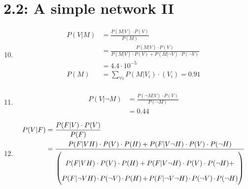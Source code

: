 \documentclass[a4paper,10pt,fleqn]{article}
\begin{document}
\section*{2.2: A simple network II}

\begin{enumerate}[1.]
    \setcounter{enumi}{9}

    \item
        \begin{align*}
            P(V|M)
                & = \frac{P(M|V)\cdot P(V)}{P(M)} \\
                & = \frac{P(M|V)\cdot P(V)}{P(M|V)\cdot P(V) + P(M|\lnot V)\cdot P(\lnot V)} \\
                & = 4.4 \cdot 10^{-5} \\
            P(M)
                & = \sum_{\forall i} P(M|V_i) \cdot (V_i) = 0.91 \\
        \end{align*}

    \item
        \begin{align*}
            P(V|\lnot M)
                & = \frac{P(\lnot M|V) \cdot P(V)}{P(\lnot M)} \\
                & = 0.44
        \end{align*}

    \item
        \begin{align*}
            P(V|F)
                & = \frac{P(F|V)\cdot P(V)}{P(F)}  \\
                & = \frac{
                        P(F|VH) \cdot P(V) \cdot P(H) +
                        P(F|V \lnot H) \cdot P(V) \cdot P(\lnot H)
                      }{
                        \left( \parbox{9cm}{
                            $$P(F|VH) \cdot P(V) \cdot P(H) +
                            P(F|V \lnot H) \cdot P(V) \cdot P(\lnot H) +$$
                            $$P(F|\lnot VH) \cdot P(\lnot V) \cdot P(H) +
                            P(F|\lnot V\lnot H) \cdot P(\lnot V) \cdot P(\lnot H)$$
                        } \right)
                      }
        \end{align*}


\end{enumerate}
\end{document}
